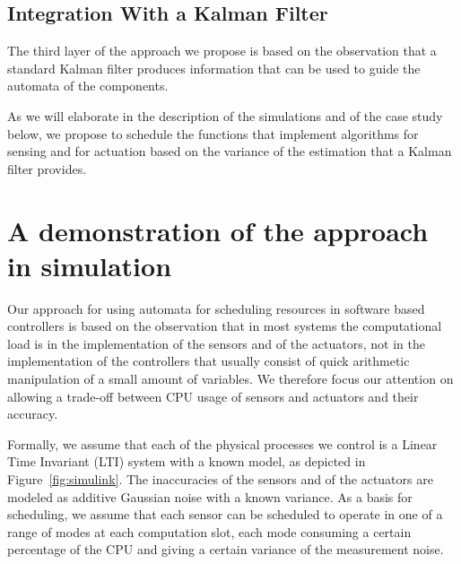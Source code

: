 \documentclass{sig-alternate-ipsn13}
\begin{document}
\subsection{Integration With a Kalman Filter}
The third layer of the approach we propose is based on the observation that a standard Kalman filter produces information that can be used to guide the automata of the components. 

As we will elaborate in the description of the simulations and of the case study below, we propose to schedule the functions that implement algorithms for sensing and for actuation based on the variance of the estimation that a Kalman filter provides. 



\section{A demonstration of the approach in simulation}
\label{sec:simulation}

Our approach for using automata for scheduling resources in software based controllers is based on the observation that in most systems the computational load is in the implementation of the sensors and of the actuators, not in the implementation of the controllers that usually consist of quick arithmetic manipulation of a small amount of variables. We therefore focus our attention on allowing a trade-off between CPU usage of sensors and actuators and their accuracy. %


Formally, we assume that each of the physical processes we control is a Linear Time Invariant (LTI) system with a known model, as depicted in Figure~\ref{fig:simulink}. The inaccuracies of the sensors and of the actuators are modeled as additive Gaussian noise with a known variance. As a basis for scheduling, we assume that each sensor can be scheduled to operate in one of a range of modes at each computation slot, each mode consuming a certain percentage of the CPU and giving a certain variance of the measurement noise.
\end{document}
